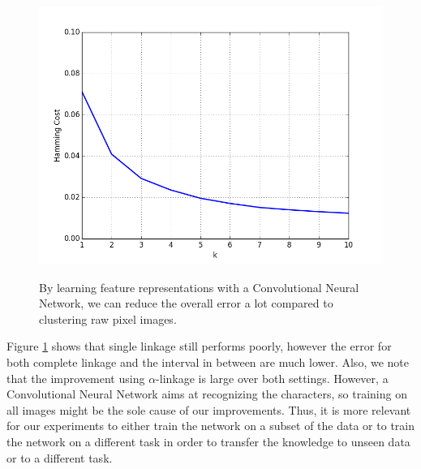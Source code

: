 \begin{figure}[h]
\begin{minipage}{.45\textwidth}
  {\includegraphics[width=\linewidth]{plots/mnist-cnn-sc-random-top-10}}
\end{minipage}
\caption{By learning feature representations with a Convolutional Neural Network, we can reduce the overall error a lot compared to clustering raw pixel images.}
\label{fig:mnist1000cnn}
\end{figure}

Figure \ref{fig:mnist1000cnn} shows that single linkage still performs poorly, however the error for both complete linkage and the interval in between are much lower. Also, we note that the improvement using $\alpha$-linkage is large over both settings. However, a Convolutional Neural Network aims at recognizing the characters, so training on all images might be the sole cause of our improvements. Thus, it is more relevant for our experiments to either train the network on a subset of the data or to train the network on a different task in order to transfer the knowledge to unseen data or to a different task.

